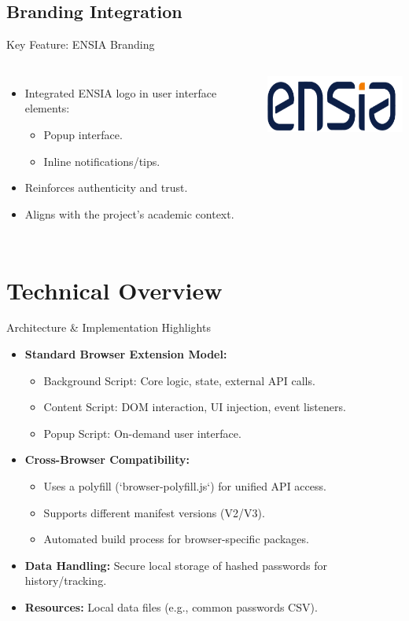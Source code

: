 \documentclass[aspectratio=169]{beamer}
\begin{document}
\subsection{Branding Integration}
\begin{frame}{Key Feature: ENSIA Branding}
  \begin{columns}
     \begin{itemize}
       \item Integrated ENSIA logo in user interface elements:
       \begin{itemize}
         \item Popup interface.
         \item Inline notifications/tips.
       \end{itemize}
       \item Reinforces authenticity and trust.
       \item Aligns with the project's academic context.
     \end{itemize}
     \centering
     \includegraphics[height=2cm]{EnsiaLogo.png}
  \end{columns}
\end{frame}

\section{Technical Overview}
\begin{frame}{Architecture \& Implementation Highlights}
  \begin{itemize}
    \item \textbf{Standard Browser Extension Model:}
    \begin{itemize}
       \item Background Script: Core logic, state, external API calls.
       \item Content Script: DOM interaction, UI injection, event listeners.
       \item Popup Script: On-demand user interface.
    \end{itemize}
    \item \textbf{Cross-Browser Compatibility:}
    \begin{itemize}
      \item Uses a polyfill (`browser-polyfill.js`) for unified API access.
      \item Supports different manifest versions (V2/V3).
      \item Automated build process for browser-specific packages.
    \end{itemize}
     \item \textbf{Data Handling:} Secure local storage of hashed passwords for history/tracking.
     \item \textbf{Resources:} Local data files (e.g., common passwords CSV).
  \end{itemize}
\end{frame}
\end{document}
